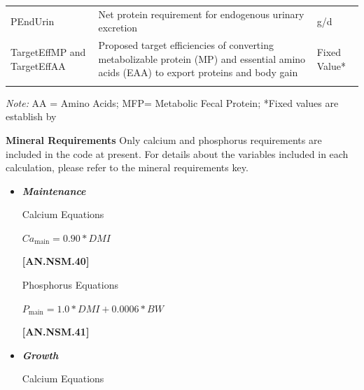 \begin{refsection}
\begin{itemize}
\begin{longtable}{@{} L{3.5cm} L{5.5cm} L{3.5cm} @{}}
PEndUrin  &   Net protein requirement for endogenous urinary excretion  &  g/d\\
TargetEffMP and TargetEffAA &  Proposed target efficiencies of converting metabolizable protein (MP) and essential amino acids (EAA) to export proteins and body gain  & Fixed Value* \\
\bottomrule
\endlastfoot
\end{longtable}
    \vspace{-0.3cm}
{\footnotesize\textit{Note:} AA = Amino Acids; MFP= Metabolic Fecal Protein; *Fixed values are establish by \textcite{nrc2021}}
\vspace{0.5cm}


\textbf{ Mineral Requirements} Only calcium and phosphorus requirements are included in the code at present. For details about the variables included in each calculation, please refer to the mineral requirements key.
    \vspace{0.5cm}

\begin{itemize}
    \item \textbf{\textit{Maintenance}} 
    \vspace{0.25cm}
    
Calcium Equations
\vspace{0.25cm}

    \begin{center}
    \(Ca_{\text{main}} =  0.90 * DMI\)
    \end{center}

\vspace{0.5cm}
            {\raggedleft \textbf{[AN.NSM.40]}\par}
            \vspace{0.5cm}

Phosphorus Equations
\vspace{0.25cm}

    \begin{center}
    \(P_{\text{main}} =  1.0 * DMI + 0.0006 * BW\)
    \end{center}

\vspace{0.5cm}
            {\raggedleft \textbf{[AN.NSM.41]}\par}
            \vspace{0.5cm}

    \item \textbf{\textit{Growth}} 
    \vspace{0.25cm}
    
Calcium Equations
\vspace{0.25cm}


\end{itemize}
\end{itemize}
\end{refsection}
